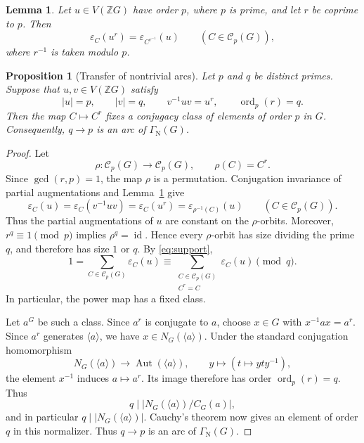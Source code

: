 \documentclass[10pt,a4paper]{amsart}
\newtheorem{lemma}{Lemma}
\newtheorem{proposition}{Proposition}
\newcommand{\Aut}{\operatorname{Aut}}
\newcommand{\GN}{\Gamma_{\mathrm N}}
\newcommand{\VZG}{V(\mathbb ZG)}
\newcommand{\eps}{\varepsilon}
\begin{document}
\begin{lemma}\label{lem:power}
Let $u\in\VZG$ have order $p$, where $p$ is prime, and let $r$ be coprime
to $p$. Then
\[
 \eps_C(u^r)
 =
 \eps_{C^{r^{-1}}}(u)
 \qquad
 (C\in\mathcal C_p(G)),
\]
where $r^{-1}$ is taken modulo $p$.
\end{lemma}

\begin{proposition}[Transfer of nontrivial arcs]\label{prop:transfer}
Let $p$ and $q$ be distinct primes. Suppose that $u,v\in\VZG$ satisfy
\[
 |u|=p,\qquad |v|=q,\qquad v^{-1}uv=u^r,
 \qquad \operatorname{ord}_p(r)=q.
\]
Then the map $C\mapsto C^r$ fixes a conjugacy class of elements of order
$p$ in $G$. Consequently, $q\to p$ is an arc of $\GN(G)$.
\end{proposition}

\begin{proof}
Let
\[
 \rho\colon\mathcal C_p(G)\longrightarrow\mathcal C_p(G),
 \qquad \rho(C)=C^r.
\]
Since $\gcd(r,p)=1$, the map $\rho$ is a permutation. Conjugation
invariance of partial augmentations and Lemma~\ref{lem:power} give
\[
 \eps_C(u)
 =
 \eps_C(v^{-1}uv)
 =
 \eps_C(u^r)
 =
 \eps_{\rho^{-1}(C)}(u)
 \qquad(C\in\mathcal C_p(G)).
\]
Thus the partial augmentations of $u$ are constant on the $\rho$-orbits.
Moreover, $r^q\equiv1\pmod p$ implies $\rho^q=\operatorname{id}$. Hence
every $\rho$-orbit has size dividing the prime $q$, and therefore has size
$1$ or $q$. By \eqref{eq:support},
\[
 1
 =
 \sum_{C\in\mathcal C_p(G)}\eps_C(u)
 \equiv
 \sum_{\substack{C\in\mathcal C_p(G)\\ C^r=C}}
 \eps_C(u)
 \pmod q.
\]
In particular, the power map has a fixed class.

Let $a^G$ be such a class. Since $a^r$ is conjugate to $a$, choose $x\in G$
with $x^{-1}ax=a^r$. Since $a^r$ generates $\langle a\rangle$, we have
$x\in N_G(\langle a\rangle)$. Under the standard conjugation homomorphism
\[
 N_G(\langle a\rangle)\longrightarrow
 \Aut(\langle a\rangle),
 \qquad y\longmapsto(t\longmapsto yty^{-1}),
\]
the element $x^{-1}$ induces $a\mapsto a^r$. Its image therefore has order
$\operatorname{ord}_p(r)=q$. Thus
\[
 q\mid\bigl|N_G(\langle a\rangle)/C_G(a)\bigr|,
\]
and in particular $q\mid |N_G(\langle a\rangle)|$. Cauchy's theorem now
gives an element of order $q$ in this normalizer. Thus $q\to p$ is an arc
of $\GN(G)$.
\end{proof}
\end{document}
